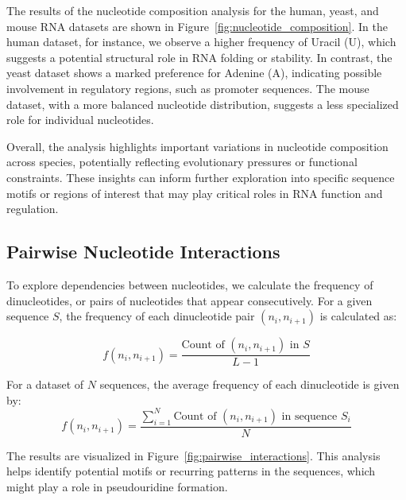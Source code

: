 
    The results of the nucleotide composition analysis for the human, yeast, and mouse RNA datasets are shown in Figure~\ref{fig:nucleotide_composition}. In the human dataset, for instance, we observe a higher frequency of Uracil (U), which suggests a potential structural role in RNA folding or stability. In contrast, the yeast dataset shows a marked preference for Adenine (A), indicating possible involvement in regulatory regions, such as promoter sequences. The mouse dataset, with a more balanced nucleotide distribution, suggests a less specialized role for individual nucleotides.

    Overall, the analysis highlights important variations in nucleotide composition across species, potentially reflecting evolutionary pressures or functional constraints. These insights can inform further exploration into specific sequence motifs or regions of interest that may play critical roles in RNA function and regulation.

  \subsection{Pairwise Nucleotide Interactions}\label{subsec:pairwise-nucleotide-interactions}
    To explore dependencies between nucleotides, we calculate the frequency of dinucleotides, or pairs of nucleotides that appear consecutively. For a given sequence \( S \), the frequency of each dinucleotide pair \( (n_i, n_{i+1}) \) is calculated as:

    \[
      f(n_i, n_{i+1}) = \frac{\text{Count of } (n_i, n_{i+1}) \text{ in } S}{L-1}
    \]

    For a dataset of \( N \) sequences, the average frequency of each dinucleotide is given by:
    \[
      f(n_i, n_{i+1}) = \frac{\sum_{i=1}^{N} \text{Count of } (n_i, n_{i+1}) \text{ in sequence } S_i}{N}
    \]

    The results are visualized in Figure~\ref{fig:pairwise_interactions}. This analysis helps identify potential motifs or recurring patterns in the sequences, which might play a role in pseudouridine formation.


